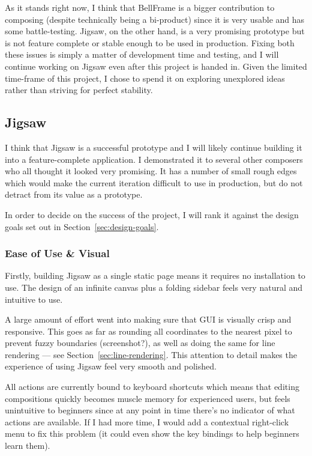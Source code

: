 \documentclass[12pt]{article}
\begin{document}
As it stands right now, I think that BellFrame is a bigger contribution to composing (despite
technically being a bi-product) since it is very usable and has some battle-testing.  Jigsaw, on
the other hand, is a very promising prototype but is not feature complete or stable enough to be
used in production.  Fixing both these issues is simply a matter of development time and testing, 
and I will continue working on Jigsaw even after this project is handed in.  Given the limited
time-frame of this project, I chose to spend it on exploring unexplored ideas rather than striving
for perfect stability.

\subsection{Jigsaw}

I think that Jigsaw is a successful prototype and I will likely continue building it into a
feature-complete application.  I demonstrated it to several other composers who all thought it
looked very promising.  It has a number of small rough edges which would make the current iteration
difficult to use in production, but do not detract from its value as a prototype.

In order to decide on the success of the project, I will rank it against the design goals set out in
Section~\ref{sec:design-goals}.

\subsubsection{Ease of Use \& Visual}

Firstly, building Jigsaw as a single static page means it requires no installation to use.  The
design of an infinite canvas plus a folding sidebar feels very natural and intuitive to use.

A large amount of effort went into making sure that GUI is visually crisp and responsive.  This
goes as far as rounding all coordinates to the nearest pixel to prevent fuzzy boundaries
(screenshot?), as well as doing the same for line rendering --- see
Section~\ref{sec:line-rendering}.  This attention to detail makes the experience of using Jigsaw
feel very smooth and polished.

All actions are currently bound to keyboard shortcuts which means that editing compositions quickly
becomes muscle memory for experienced users, but feels unintuitive to beginners since at any point
in time there's no indicator of what actions are available.  If I had more time, I would add a
contextual right-click menu to fix this problem (it could even show the key bindings to help
beginners learn them).
\end{document}
